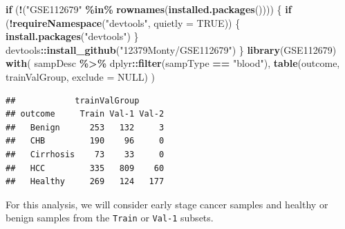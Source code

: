 \documentclass[
]{book}
\newenvironment{Shaded}{\begin{snugshade}}{\end{snugshade}}
\newcommand{\ControlFlowTok}[1]{\textcolor[rgb]{0.13,0.29,0.53}{\textbf{#1}}}
\newcommand{\DataTypeTok}[1]{\textcolor[rgb]{0.13,0.29,0.53}{#1}}
\newcommand{\KeywordTok}[1]{\textcolor[rgb]{0.13,0.29,0.53}{\textbf{#1}}}
\newcommand{\NormalTok}[1]{#1}
\newcommand{\OperatorTok}[1]{\textcolor[rgb]{0.81,0.36,0.00}{\textbf{#1}}}
\newcommand{\OtherTok}[1]{\textcolor[rgb]{0.56,0.35,0.01}{#1}}
\newcommand{\StringTok}[1]{\textcolor[rgb]{0.31,0.60,0.02}{#1}}
\begin{document}
\begin{Shaded}
\begin{Highlighting}[]
\ControlFlowTok{if}\NormalTok{ (}\OperatorTok{!}\NormalTok{(}\StringTok{"GSE112679"} \OperatorTok{\%in\%}\StringTok{ }\KeywordTok{rownames}\NormalTok{(}\KeywordTok{installed.packages}\NormalTok{()))) \{}
  \ControlFlowTok{if}\NormalTok{ (}\OperatorTok{!}\KeywordTok{requireNamespace}\NormalTok{(}\StringTok{"devtools"}\NormalTok{, }\DataTypeTok{quietly =} \OtherTok{TRUE}\NormalTok{)) \{}
    \KeywordTok{install.packages}\NormalTok{(}\StringTok{"devtools"}\NormalTok{)}
\NormalTok{  \}}
\NormalTok{  devtools}\OperatorTok{::}\KeywordTok{install\_github}\NormalTok{(}\StringTok{"12379Monty/GSE112679"}\NormalTok{)}
\NormalTok{\}}
\KeywordTok{library}\NormalTok{(GSE112679)}
\KeywordTok{with}\NormalTok{(}
\NormalTok{  sampDesc }\OperatorTok{\%>\%}\StringTok{ }\NormalTok{dplyr}\OperatorTok{::}\KeywordTok{filter}\NormalTok{(sampType }\OperatorTok{==}\StringTok{ "blood"}\NormalTok{),}
  \KeywordTok{table}\NormalTok{(outcome, trainValGroup, }\DataTypeTok{exclude =} \OtherTok{NULL}\NormalTok{)}
\NormalTok{)}
\end{Highlighting}
\end{Shaded}

\begin{verbatim}
##            trainValGroup
## outcome     Train Val-1 Val-2
##   Benign      253   132     3
##   CHB         190    96     0
##   Cirrhosis    73    33     0
##   HCC         335   809    60
##   Healthy     269   124   177
\end{verbatim}

For this analysis, we will consider early stage cancer samples
and healthy or benign samples from the \texttt{Train} or \texttt{Val-1} subsets.
\end{document}
